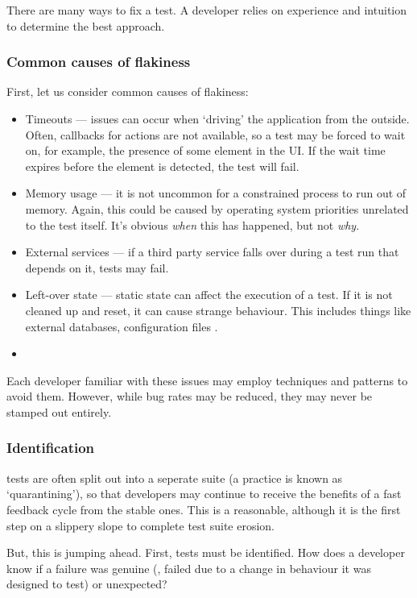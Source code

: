 There are many ways to fix a \flaky{} test. A developer relies on experience and intuition to determine the best approach.

\subsubsection{Common causes of flakiness}

First, let us consider common causes of flakiness:
\begin{itemize}
	\item Timeouts --- issues can occur when {\lq}driving{\rq} the application from the outside. Often, callbacks for actions are not available, so a test may be forced to wait on, for example, the presence of some element in the UI. If the wait time expires before the element is detected, the test will fail.
	\item Memory usage --- it is not uncommon for a constrained process to run out of memory. Again, this could be caused by operating system priorities unrelated to the test itself. It's obvious \textit{when} this has happened, but not \textit{why}.
	\item External services --- if a third party service falls over during a test run that depends on it, tests may fail.
	\item Left-over state --- static state can affect the execution of a test. If it is not cleaned up and reset, it can cause strange behaviour. This includes things like external databases, configuration files \etc.
	\item {}
\end{itemize}

Each developer familiar with these issues may employ techniques and patterns to avoid them. However, while bug rates may be reduced, they may never be stamped out entirely.

\subsubsection{Identification}

\flaky{} tests are often split out into a seperate suite (a practice is known as {\lq}quarantining{\rq}), so that developers may continue to receive the benefits of a fast feedback cycle from the stable ones. This is a reasonable, although it is the first step on a slippery slope to complete test suite erosion.

But, this is jumping ahead. First, \flaky{} tests must be identified. How does a developer know if a failure was genuine (\ie, failed due to a change in behaviour it was designed to test) or unexpected?

